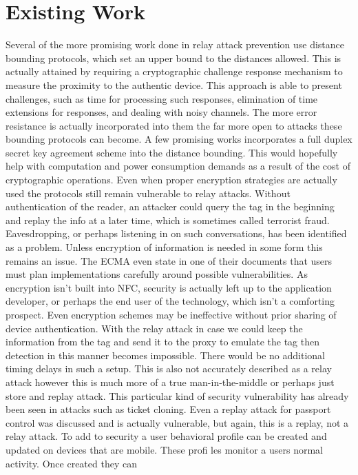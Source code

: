 \documentclass[conference]{IEEEtran}
\begin{document}
\section{Existing Work}
Several of the more promising work done in relay attack prevention use distance bounding protocols, which set an upper bound to the distances allowed. This
is actually attained by requiring a cryptographic challenge response mechanism to measure the proximity to the authentic device. This approach is able to present challenges, such as
time for processing such responses, elimination of time extensions for responses, and dealing with noisy channels. The more error resistance is actually incorporated into them the
far more open to attacks these bounding protocols can become. A few promising works incorporates a full duplex secret key agreement scheme into the distance bounding. This would hopefully help with computation and power consumption
demands as a result of the cost of cryptographic operations. Even when proper encryption
strategies are actually used the protocols still remain vulnerable to relay attacks.
Without authentication of the reader, an attacker could query the tag in the beginning and
replay the info at a later time, which is sometimes called terrorist fraud. Eavesdropping, or perhaps listening in on such conversations, has been identified
as a problem. Unless encryption of information is needed in some form this remains an
issue. The ECMA even state in one of their documents that users must plan
implementations carefully around possible vulnerabilities. As encryption isn't built
into NFC, security is actually left up to the application developer, or perhaps the end user of the technology, which isn't a comforting prospect. Even encryption schemes may
be ineffective without prior sharing of device authentication.
With the relay attack in case we could keep the information from the tag and send it to the proxy to emulate the tag then detection in this manner becomes impossible. There
would be no additional timing delays in such a setup. This is also not accurately
described as a relay attack however this is much more of a true man-in-the-middle or perhaps just
store and replay attack. This particular kind of security vulnerability has already been seen
in attacks such as ticket cloning. Even a replay attack for passport control was
discussed and is actually vulnerable, but again, this is a replay, not a relay attack.
To add to security a user behavioral profile can be created and updated on devices that are mobile. These profi les monitor a users normal activity. Once created they can
\end{document}
